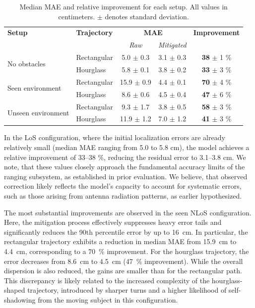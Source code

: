 \begin{table}[tbh]
\centering
\caption[Median error and relative improvement for each setup.]{Median MAE and relative improvement for each setup. All values in centimeters. $\pm$ denotes standard deviation.}
\label{tab:mae-improvement}
\begin{tabular}{llccc}
\toprule
\textbf{Setup} & \textbf{Trajectory} & \multicolumn{2}{c}{\textbf{MAE}} & \textbf{Improvement} \\
\cmidrule(lr){3-4}
 & & \textit{Raw} & \textit{Mitigated} & \\
\midrule
\multirow{2}{*}{No obstacles} 
  & Rectangular &  5.0 $\pm$ 0.3 & 3.1 $\pm$ 0.3 & \textbf{38} $\pm$ 1 \% \\
  & Hourglass   &  5.8 $\pm$ 0.1 & 3.8 $\pm$ 0.2 & \textbf{33} $\pm$ 3 \% \\
\midrule
\multirow{2}{*}{Seen environment} 
  & Rectangular & 15.9 $\pm$ 0.9 & 4.4 $\pm$ 0.1 & \textbf{70} $\pm$ 4 \% \\
  & Hourglass   &  8.6 $\pm$ 0.6 & 4.5 $\pm$ 0.4 & \textbf{47} $\pm$ 6 \% \\
\midrule
\multirow{2}{*}{Unseen environment} 
  & Rectangular &  9.3 $\pm$ 1.7 & 3.8 $\pm$ 0.5 & \textbf{58} $\pm$ 3 \% \\
  & Hourglass   & 11.9 $\pm$ 1.2 & 7.0 $\pm$ 1.2 & \textbf{41} $\pm$ 3 \% \\
\bottomrule
\end{tabular}
\end{table}

In the LoS configuration, where the initial localization errors are already relatively small (median MAE ranging from 5.0 to 5.8 \si{\centi\meter}), the model achieves a relative improvement of 33–38 \si{\percent}, reducing the residual error to 3.1–3.8 \si{\centi\meter}. We note, that these values closely approach the fundamental accuracy limits of the ranging subsystem, as established in prior evaluation. We believe, that observed correction likely reflects the model’s capacity to account for systematic errors, such as those arising from antenna radiation patterns, as earlier hypothesized.

The most substantial improvements are observed in the seen NLoS configuration. Here, the mitigation process effectively suppresses heavy error tails and significantly reduces the 90th percentile error by up to \SI{16}{\centi\metre}. In particular, the rectangular trajectory exhibits a reduction in median MAE from \SI{15.9}{\centi\metre} to \SI{4.4}{\centi\metre}, corresponding to a \SI{70}{\percent} improvement. For the hourglass trajectory, the error decreases from \SI{8.6}{\centi\metre} to \SI{4.5}{\centi\metre} (\SI{47}{\percent} improvement). While the overall dispersion is also reduced, the gains are smaller than for the rectangular path. This discrepancy is likely related to the increased complexity of the hourglass-shaped trajectory, introduced by sharper turns and a higher likelihood of self-shadowing from the moving subject in this configuration.


